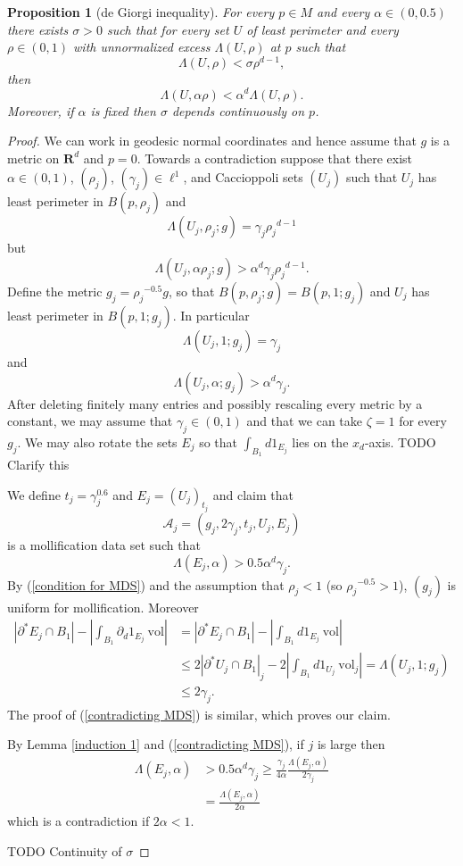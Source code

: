 \documentclass[reqno,12pt,letterpaper]{amsart}
\newcommand{\RR}{\mathbf{R}}
\newcommand{\vol}{\mathrm{vol}}
\newtheorem{proposition}[theorem]{Proposition}
\theoremstyle{definition}
\numberwithin{equation}{section}
\begin{document}
\begin{proposition}[de Giorgi inequality]\label{induction 2}
For every $p \in M$ and every $\alpha \in (0, 0.5)$ there exists $\sigma > 0$ such that for every set $U$ of least perimeter and every $\rho \in (0, 1)$ with unnormalized excess $\Lambda(U, \rho)$ at $p$ such that
$$\Lambda(U, \rho) < \sigma \rho^{d - 1},$$
then
$$\Lambda(U, \alpha\rho) < \alpha^d \Lambda(U, \rho).$$
Moreover, if $\alpha$ is fixed then $\sigma$ depends continuously on $p$.
\end{proposition}
\begin{proof}
We can work in geodesic normal coordinates and hence assume that $g$ is a metric on $\RR^d$ and $p = 0$.
Towards a contradiction suppose that there exist $\alpha \in (0, 1)$, $(\rho_j)$, $(\gamma_j) \in \ell^1$, and Caccioppoli sets $(U_j)$ such that $U_j$ has least perimeter in $B(p, \rho_j)$ and
$$\Lambda(U_j, \rho_j; g) = \gamma_j {\rho_j}^{d - 1}$$
but
$$\Lambda(U_j, \alpha \rho_j; g) > \alpha^d \gamma_j {\rho_j}^{d - 1}.$$
Define the metric $g_j = {\rho_j}^{-0.5} g$, so that $B(p, \rho_j; g) = B(p, 1; g_j)$ and $U_j$ has least perimeter in $B(p, 1; g_j)$.
In particular
$$\Lambda(U_j, 1; g_j) = \gamma_j$$
and
$$\Lambda(U_j, \alpha; g_j) > \alpha^d \gamma_j.$$
After deleting finitely many entries and possibly rescaling every metric by a constant, we may assume that $\gamma_j \in (0, 1)$ and that we can take $\zeta = 1$ for every $g_j$.
We may also rotate the sets $E_j$ so that $\int_{B_1} d1_{E_j}$ lies on the $x_d$-axis.
TODO Clarify this

We define $t_j = \gamma_j^{0.6}$ and $E_j = (U_j)_{t_j}$ and claim that
$$\mathcal A_j = (g_j, 2\gamma_j, t_j, U_j, E_j)$$
is a mollification data set such that
\begin{equation}
\label{contradicting MDS}
\Lambda(E_j, \alpha) > 0.5\alpha^d\gamma_j.
\end{equation}
By (\ref{condition for MDS}) and the assumption that $\rho_j < 1$ (so ${\rho_j}^{-0.5} > 1$), $(g_j)$ is uniform for mollification.
Moreover
\begin{align*}
|\partial^* E_j \cap B_1| - \left|\int_{B_1} \partial_d 1_{E_j} ~\vol\right| &= |\partial^* E_j \cap B_1| - \left|\int_{B_1} d1_{E_j} ~\vol\right| \\
&\leq 2|\partial^* U_j \cap B_1|_j - 2\left|\int_{B_1} d1_{U_j} ~\vol_j\right| = \Lambda(U_j, 1; g_j) \\
&\leq 2\gamma_j.
\end{align*}
The proof of (\ref{contradicting MDS}) is similar, which proves our claim.

By Lemma \ref{induction 1} and (\ref{contradicting MDS}), if $j$ is large then
\begin{align*}
\Lambda(E_j, \alpha) &> 0.5 \alpha^d \gamma_j \geq \frac{\gamma_j}{4\alpha} \frac{\Lambda(E_j, \alpha)}{2\gamma_j} \\
&= \frac{\Lambda(E_j, \alpha)}{2\alpha}
\end{align*}
which is a contradiction if $2\alpha < 1$.

TODO Continuity of $\sigma$
\end{proof}
\end{document}
